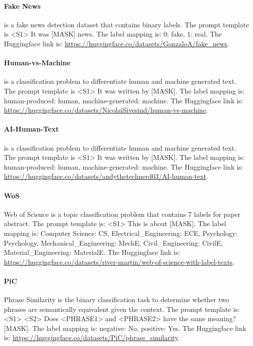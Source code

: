 \paragraph{Fake News} is a fake news detection dataset that contains binary labels. The prompt template is \textless{}S1\textgreater{} It was {[}MASK{]} news. The label mapping is: 0: fake, 1: real. The Huggingface link is: \url{https://huggingface.co/datasets/GonzaloA/fake_news}.

\paragraph{Human-vs-Machine} \citep{sivesind_2023} is a classification problem to differentiate human and machine generated text. The prompt template is \textless{}S1\textgreater{} It was written by {[}MASK{]}. The label mapping is: human-produced: human, machine-generated: machine. The Huggingface link is: \url{https://huggingface.co/datasets/NicolaiSivesind/human-vs-machine}.

\paragraph{AI-Human-Text} is a classification problem to differentiate human and machine generated text. The prompt template is \textless{}S1\textgreater{} It was written by {[}MASK{]}. The label mapping is: human-produced: human, machine-generated: machine. The Huggingface link is: \url{https://huggingface.co/datasets/andythetechnerd03/AI-human-text}.

\paragraph{WoS} Web of Science \citep{kowsari2017HDLTex} is a topic classification problem that contains 7 labels for paper abstract. The prompt template is: \textless{}S1\textgreater{} This is about {[}MASK{]}. The label mapping is: Computer Science: CS, Electrical\_Engineering: ECE, Psychology: Psychology, Mechanical\_Engineering: MechE, Civil\_Engineering: CivilE, Material\_Engineering: MaterialE. The Huggingface link is: \url{https://huggingface.co/datasets/river-martin/web-of-science-with-label-texts}.

\paragraph{PiC} Phrase Similarity \citep{pham2022PiC} is the binary classification task to determine whether two phrases are semantically equivalent given the context. The prompt template is: \textless{}S1\textgreater{} \textless{}S2\textgreater{} Does \textless{}PHRASE1\textgreater{} and \textless{}PHRASE2\textgreater{} have the same meaning? {[}MASK{]}. The label mapping is: negative: No, positive: Yes. The Huggingface link is: \url{https://huggingface.co/datasets/PiC/phrase_similarity}.

